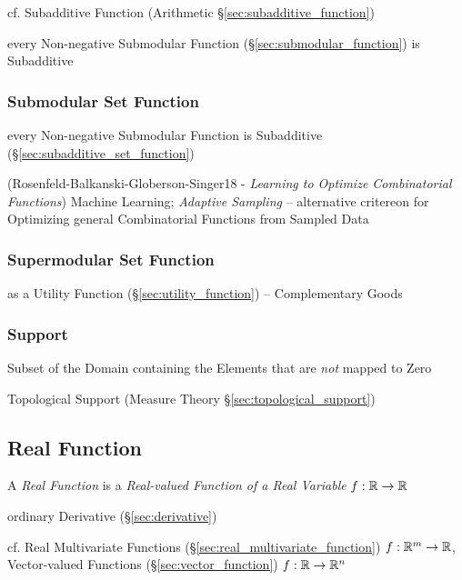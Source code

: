 cf. Subadditive Function (Arithmetic \S\ref{sec:subadditive_function})

every Non-negative Submodular Function (\S\ref{sec:submodular_function}) is
Subadditive



\subsubsection{Submodular Set Function}\label{sec:submodular_set_function}

every Non-negative Submodular Function is Subadditive
(\S\ref{sec:subadditive_set_function})

(Rosenfeld-Balkanski-Globerson-Singer18 - \emph{Learning to Optimize
  Combinatorial Functions}) Machine Learning; \emph{Adaptive Sampling} --
alternative critereon for Optimizing general Combinatorial Functions from
Sampled Data



\subsubsection{Supermodular Set Function}\label{sec:submodular_set_function}

as a Utility Function (\S\ref{sec:utility_function}) -- Complementary Goods



\subsubsection{Support}\label{sec:support}

Subset of the Domain containing the Elements that are \emph{not} mapped to Zero

Topological Support (Measure Theory \S\ref{sec:topological_support})



\subsection{Real Function}\label{sec:real_function}

A \emph{Real Function} is a \emph{Real-valued Function of a Real Variable}
$f : \mathbb{R} \rightarrow \mathbb{R}$

ordinary Derivative (\S\ref{sec:derivative})

\fist cf. Real Multivariate Functions (\S\ref{sec:real_multivariate_function})
$f : \mathbb{R}^m \rightarrow \mathbb{R}$,
Vector-valued Functions (\S\ref{sec:vector_function}) $f : \mathbb{R} \rightarrow
\mathbb{R}^n$

